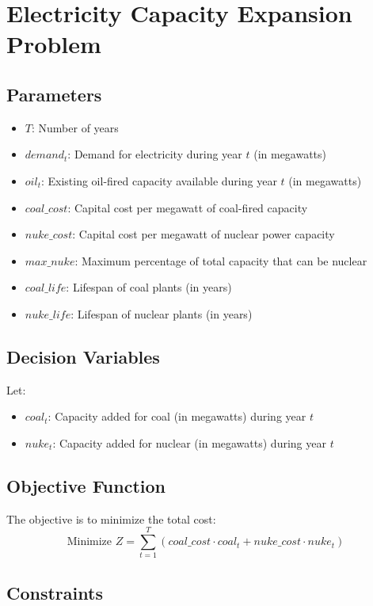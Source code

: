 \documentclass{article}
\begin{document}
\section*{Electricity Capacity Expansion Problem}

\subsection*{Parameters}
\begin{itemize}
    \item $T$: Number of years
    \item $demand_t$: Demand for electricity during year $t$ (in megawatts)
    \item $oil_t$: Existing oil-fired capacity available during year $t$ (in megawatts)
    \item $coal\_cost$: Capital cost per megawatt of coal-fired capacity
    \item $nuke\_cost$: Capital cost per megawatt of nuclear power capacity
    \item $max\_nuke$: Maximum percentage of total capacity that can be nuclear
    \item $coal\_life$: Lifespan of coal plants (in years)
    \item $nuke\_life$: Lifespan of nuclear plants (in years)
\end{itemize}

\subsection*{Decision Variables}
Let:
\begin{itemize}
    \item $coal_t$: Capacity added for coal (in megawatts) during year $t$
    \item $nuke_t$: Capacity added for nuclear (in megawatts) during year $t$
\end{itemize}

\subsection*{Objective Function}
The objective is to minimize the total cost:
\[
\text{Minimize } Z = \sum_{t=1}^T (coal\_cost \cdot coal_t + nuke\_cost \cdot nuke_t)
\]

\subsection*{Constraints}
\end{document}
